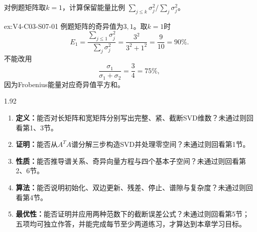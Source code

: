 \begin{SLChapterExercisePairSection}
\begin{exercise}\label{ex:V4-C03-S07-01}
对例题矩阵取$k=1$，计算保留能量比例
$\sum_{j\leq k}\sigma_j^2/\sum_j\sigma_j^2$。
\end{exercise}
\ifSLFullEdition
{}\label{sol:V4-C03-S07-01}
\begin{chapterexercisesolution}{ex:V4-C03-S07-01}
例题矩阵的奇异值为$3,1$。取$k=1$时
\[
E_1
=\frac{\sum_{j\le1}\sigma_j^2}{\sum_j\sigma_j^2}
=\frac{3^2}{3^2+1^2}
=\frac9{10}=90\%.
\]
不能改用
\[
\frac{\sigma_1}{\sigma_1+\sigma_2}
=\frac34=75\%,
\]
因为Frobenius能量对应奇异值平方和。
\end{chapterexercisesolution}
\fi

\end{SLChapterExercisePairSection}
\begin{SLCompactClosure}
\begin{spacing}{1.92}

\label{struct:V4-C03-CH36}

\label{struct:V4-C03-CH37}
\begin{selfcheckbox}
\begin{enumerate}[leftmargin=2.2em,itemsep=1.7em]
  \item \textbf{定义：}能否对长矩阵和宽矩阵分别写出完整、紧、截断SVD维数？未通过则回看第1、3节。
  \item \textbf{证明：}能否从$A^TA$谱分解三步构造SVD并处理零空间？未通过则回看第1节。
  \item \textbf{性质：}能否推导谱关系、奇异向量方程与四个基本子空间？未通过则回看第2、6节。
  \item \textbf{算法：}能否说明初始化、双边更新、残差、停止、谱隙与复杂度？未通过则回看第4节。
  \item \textbf{最优性：}能否证明并应用两种范数下的截断误差公式？未通过则回看第5节；五项均可独立作答，并能完成每节至少两道练习，才算达到本章学习目标。
\end{enumerate}
\end{selfcheckbox}
\end{spacing}
\end{SLCompactClosure}
